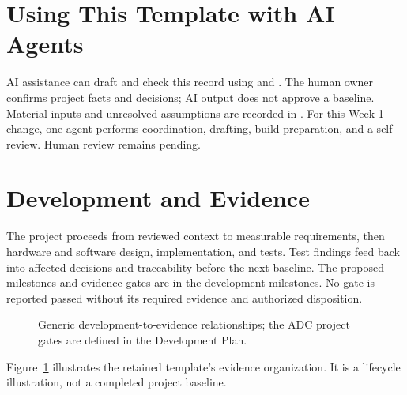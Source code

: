 \section{Using This Template with AI Agents}
\label{Section:UsingTemplateAI}
AI assistance can draft and check this record using
 and .
The human owner confirms project facts and decisions; AI output does not
approve a baseline. Material inputs and unresolved assumptions are recorded in
. For this Week 1 change, one agent performs
coordination, drafting, build preparation, and a self-review. Human review
remains pending.

\section{Development and Evidence}
The project proceeds from reviewed context to measurable requirements, then
hardware and software design, implementation, and tests. Test findings feed
back into affected decisions and traceability before the next baseline.
The proposed milestones and evidence gates are in
\hyperref[Table:WeekOneMilestones]{the development milestones}. No gate is
reported passed without its required evidence and authorized disposition.

\begin{figure}[htbp]
\centering

\caption{Generic development-to-evidence relationships; the ADC project gates
are defined in the Development Plan.}
\label{Figure:VModel}
\end{figure}
Figure~\ref{Figure:VModel} illustrates the retained template's evidence
organization. It is a lifecycle illustration, not a completed project baseline.
